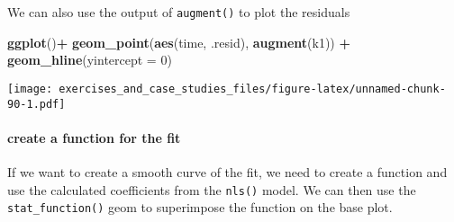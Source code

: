 \documentclass[]{book}
\newenvironment{Shaded}{\begin{snugshade}}{\end{snugshade}}
\newcommand{\ControlFlowTok}[1]{\textcolor[rgb]{0.13,0.29,0.53}{\textbf{#1}}}
\newcommand{\DataTypeTok}[1]{\textcolor[rgb]{0.13,0.29,0.53}{#1}}
\newcommand{\DecValTok}[1]{\textcolor[rgb]{0.00,0.00,0.81}{#1}}
\newcommand{\FloatTok}[1]{\textcolor[rgb]{0.00,0.00,0.81}{#1}}
\newcommand{\KeywordTok}[1]{\textcolor[rgb]{0.13,0.29,0.53}{\textbf{#1}}}
\newcommand{\NormalTok}[1]{#1}
\newcommand{\OperatorTok}[1]{\textcolor[rgb]{0.81,0.36,0.00}{\textbf{#1}}}
\newcommand{\StringTok}[1]{\textcolor[rgb]{0.31,0.60,0.02}{#1}}
\let\oldparagraph\paragraph
\renewcommand{\paragraph}[1]{\oldparagraph{#1}\mbox{}}
\theoremstyle{definition}
\theoremstyle{definition}
\theoremstyle{definition}
\theoremstyle{remark}
\begin{document}
We can also use the output of \texttt{augment()} to plot the residuals

\begin{Shaded}
\begin{Highlighting}[]
\KeywordTok{ggplot}\NormalTok{()}\OperatorTok{+}
\StringTok{  }\KeywordTok{geom_point}\NormalTok{(}\KeywordTok{aes}\NormalTok{(time, .resid), }\KeywordTok{augment}\NormalTok{(k1)) }\OperatorTok{+}
\StringTok{  }\KeywordTok{geom_hline}\NormalTok{(}\DataTypeTok{yintercept =} \DecValTok{0}\NormalTok{)}
\end{Highlighting}
\end{Shaded}

\texttt{[image: exercises\_and\_case\_studies\_files/figure-latex/unnamed-chunk-90-1.pdf]}

\hypertarget{create-a-function-for-the-fit}{%
\paragraph{create a function for the
fit}\label{create-a-function-for-the-fit}}

If we want to create a smooth curve of the fit, we need to create a
function and use the calculated coefficients from the \texttt{nls()}
model. We can then use the \texttt{stat\_function()} geom to superimpose
the function on the base plot.

\begin{Shaded}
\end{Shaded}
\end{document}
